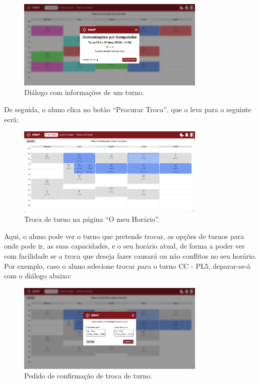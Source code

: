 \documentclass[12pt, a4paper]{article}
\begin{document}
\begin{figure}[H]
    \centering
    \includegraphics[width=0.8\textwidth]{res/manual/popup_turno_meu_horario.png}
    \caption{Diálogo com informações de um turno.}
    \label{popup_turno}
\end{figure}

De seguida, o aluno clica no botão ``Procurar Troca'', que o leva para o seguinte ecrã:

\begin{figure}[H]
    \centering
    \includegraphics[width=0.8\textwidth]{res/manual/pagina_procura_troca_meu_horario.png}
    \caption{Troca de turno na página ``O meu Horário''.}
    \label{procura_troca}
\end{figure}

Aqui, o aluno pode ver o turno que pretende trocar, as opções de turnos para onde pode ir, as suas
capacidades, e o seu horário atual, de forma a poder ver com facilidade se a troca que deseja fazer
causará ou não conflitos no seu horário. Por exemplo, caso o aluno selecione trocar para o turno
CC - PL5, deparar-se-á com o diálogo abaixo:

\begin{figure}[H]
    \centering
    \includegraphics[width=0.8\textwidth]{res/manual/popup_pedir_troca.png}
    \caption{Pedido de confirmação de troca de turno.}
    \label{popup_pedir_troca}
\end{figure}
\end{document}
